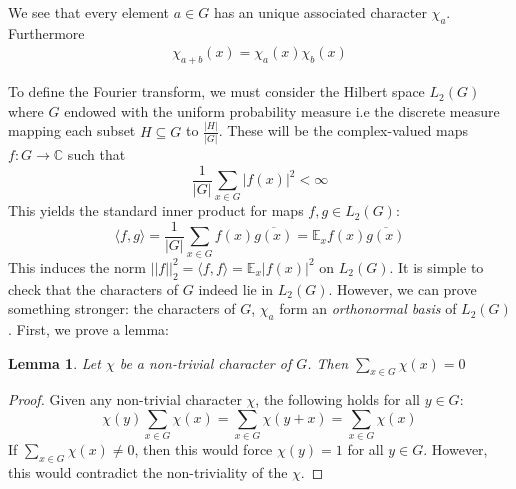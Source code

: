 \documentclass{amsart}
\newtheorem{lemma}[theorem]{Lemma}
\theoremstyle{definition}
\theoremstyle{remark}
\numberwithin{equation}{section}
\theoremstyle{remark}
\begin{document}
\noindent We see that every element $a \in G$ has an unique associated character $\chi_a$. Furthermore
%
\begin{gather} \label{chargroup}
  \chi_{a+b}(x)  = \chi_{a}(x)\chi_{b}(x)
\end{gather} \newline

To define the Fourier transform, we must consider the Hilbert space $L_2(G)$ where $G$ endowed with the uniform probability measure i.e the discrete measure mapping each subset $H \subseteq G$ to $\frac{|H|}{|G|}$. These will be the complex-valued maps $f: G \rightarrow \mathbb{C}$ such that
\begin{equation}
  \frac{1}{|G|}\sum_{x \in G} |f(x)|^2 < \infty
\end{equation}
%
\noindent This yields the standard inner product for maps $f,g \in L_2(G)$: \newline
%
\begin{equation}
  \langle f,g \rangle = \frac{1}{|G|}\sum_{x\in G} f(x)\overline{g(x)}= \mathbb{E}_x f(x)\overline{g(x)}
\end{equation}
%
This induces the norm $||f||_2^2 = \langle f, f \rangle = \mathbb{E}_x |f(x)|^2$ on $L_2(G)$. It is simple to check that the characters of $G$ indeed lie in $L_2(G)$. However, we can prove something stronger: the characters of $G$, $\chi_a$ form an \emph{orthonormal basis} of $L_2(G)$.
%
First, we prove a lemma:
\begin{lemma} \label{totalsum}
  Let $\chi$ be a non-trivial character of $G$. Then $\sum_{x \in G} \chi(x) = 0$
\end{lemma}
%
\begin{proof}
  Given any non-trivial character $\chi$, the following holds for all $y \in G$: \newline
    \[ \chi(y)\sum_{x \in G} \chi(x) = \sum_{x \in G} \chi(y+x) = \sum_{x \in G} \chi(x) \]\newline
    If $\sum_{x \in G} \chi(x) \neq 0$, then this would force $\chi(y) = 1$ for all $y \in G$. However, this would contradict the non-triviality of the $\chi$.
\end{proof}
\end{document}
